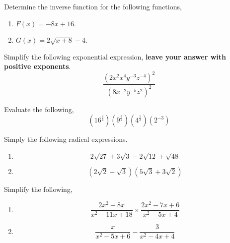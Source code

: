 \documentclass[12pt]{article} %
\begin{document}
\newpage

\begin{qstn}
  Determine the inverse function for the following functions,
  \begin{enumerate}[label=(\alph*)]
    \item $F(x) = -8x + 16$.
        \vspace*{8cm}

    \item $G(x) = 2\sqrt{x + 8} - 4$.
  \end{enumerate}
\end{qstn}

\newpage
\begin{qstn}
Simplify the following exponential expression, \textbf{leave your answer with positive exponents}.
\[
   \frac{\left(2x^2x^4y^{-3}z^{-4} \right)^{2}}{\left(8x^{-2}y^{-5}z^{2} \right)^{2}}
\] 

\end{qstn}

\vspace*{9cm}


\begin{qstn}
  Evaluate the following,
\[
      \left( 16^{\frac{4}{4}} \right) \left( 9^{\frac{3}{2}} \right) \left( 4^{\frac{1}{2}} \right) \left( 2^{-3}
      \right)
\] 
\end{qstn}

\newpage
\begin{qstn}
  Simply the following radical expressions.
  \begin{enumerate}[label=(\alph*)]
    \item \[
        2\sqrt{27} + 3\sqrt{3} - 2\sqrt{12} + \sqrt{48}  
    \] 

    \vspace*{5cm}

  \item \[
      \left( 2\sqrt{2} + \sqrt{3} \right) \left( 5\sqrt{3}  + 3\sqrt{2}\right)
  \] 
  \end{enumerate}
\end{qstn}

\newpage

\begin{qstn}
  Simplify the following,
  \begin{enumerate}[label=(\alph*)]
    \item \[
        \frac{2x^2 - 8x}{x^2 - 11x + 18} \times \frac{2x^{2} - 7x + 6}{x^2 - 5x + 4}
    \] 

    \newpage

  \item \[
      \frac{x}{x^2 - 5x + 6} - \frac{3}{x^2 - 4x + 4}
  \] 
  \end{enumerate}

\end{qstn}
\end{document}
